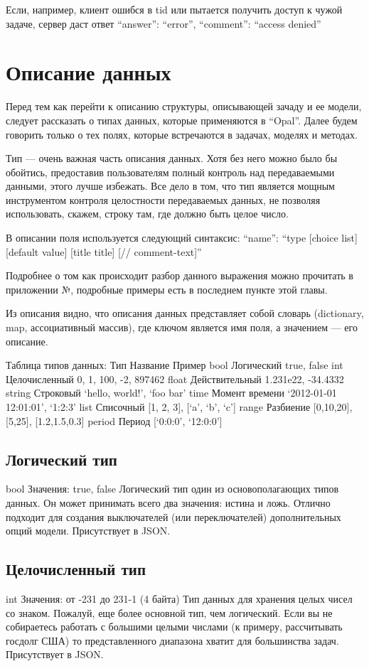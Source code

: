 {{Если, например, клиент ошибся в tid или пытается получить доступ к чужой задаче, сервер даст ответ
    {
        “answer”: “error”,
        “comment”: “access denied”
    }
        
\section{Описание данных}

Перед тем как перейти к описанию структуры, описывающей зачаду и ее модели, следует рассказать о типах данных, которые применяются в “Opal”. Далее будем говорить только о тех полях, которые встречаются в задачах, моделях и методах.

Тип — очень важная часть описания данных. Хотя без него можно было бы обойтись, предоставив пользователям полный контроль над передаваемыми данными, этого лучше избежать. Все дело в том, что тип является мощным инструментом контроля целостности передаваемых данных, не позволяя использовать, скажем, строку там, где должно быть целое число.

В описании поля используется следующий синтаксис:
        “name”: “type [choice list] [default value] [title title]
[// comment-text]”

Подробнее о том как происходит разбор данного выражения можно прочитать в приложении №, подробные примеры есть в последнем пункте этой главы.

Из описания видно, что описания данных представляет собой словарь (dictionary, map, ассоциативный массив), где ключом является имя поля, а значением — его описание.

Таблица типов данных:
Тип
	Название
	Пример
	bool
	Логический
	true, false
	int
	Целочисленный
	0, 1, 100, -2, 897462
	float
	Действительный
	1.231e22, -34.4332
	string
	Строковый
	‘hello, world!’, ‘foo bar’
	time
	Момент времени
	‘2012-01-01 12:01:01’, ‘1:2:3’
	list
	Списочный
	[1, 2, 3], [‘a’, ‘b’, ‘c’]
	range
	Разбиение
	[0,10,20], [5,25], [1.2,1.5,0.3]
	period
	Период
	[‘0:0:0’, ‘12:0:0’]
	
\subsection{Логический тип}
bool
Значения: true, false
Логический тип один из основополагающих типов данных. Он может принимать всего два значения: истина и ложь. Отлично подходит для создания выключателей (или переключателей) дополнительных опций модели.
Присутствует в JSON.

\subsection{Целочисленный тип}
int
Значения: от -231 до 231-1 (4 байта)
Тип данных для хранения целых чисел со знаком. Пожалуй, еще более основной тип, чем логический. Если вы не собираетесь работать с большими целыми числами (к примеру, рассчитывать госдолг США) то представленного диапазона хватит для большинства задач.
Присутствует в JSON.

}}
